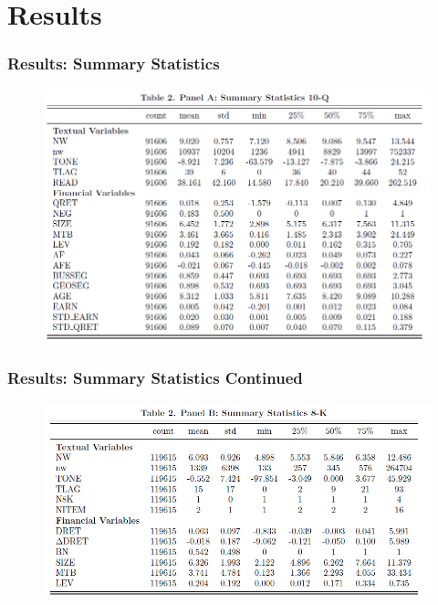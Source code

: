 \documentclass{beamer}
\begin{document}

	

\section{Results}
\begin{frame}
\frametitle{Results: Summary Statistics}
\begin{figure}[h]
	\centering
	\includegraphics[width=0.9\linewidth]{tab2panA}
	\label{tab2panA}
\end{figure}

\end{frame}
\begin{frame}
	\frametitle{Results: Summary Statistics Continued}
	\begin{figure}[h]
		\centering
		\includegraphics[width=0.9\linewidth]{tab2panB}
		\label{tab2panB}
	\end{figure}
	
\end{frame}
\end{document}
